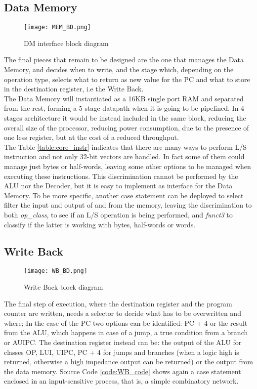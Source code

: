 \subsection{Data Memory}
\begin{figure}[!ht]
    \centering
    \texttt{[image: MEM\_BD.png]}
    \caption{DM interface block diagram}
    \label{fig:DM_BD}
\end{figure}

The final pieces that remain to be designed are the one that manages the Data Memory, and decides when to write, and the stage which, depending on the operation type, selects what to return as new value for the PC and what to store in the destination register, i.e the Write Back.\\
The Data Memory will instantiated as a 16KB single port RAM and separated from the rest, forming a 5-stage datapath when it is going to be pipelined. In 4-stages architecture it would be instead included in the same block, reducing the overall size of the processor, reducing power consumption, due to the presence of one less register, but at the cost of a reduced throughput.\\
The Table \ref{table:core_instr} indicates that there are many ways to perform L/S instruction and not only 32-bit vectors are handled. In fact some of them could manage just bytes or half-words, leaving some other options to be managed when executing these instructions. This discrimination cannot be performed by the ALU nor the Decoder, but it is easy to implement as interface for the Data Memory.
To be more specific, another case statement can be deployed to select filter the input and output of and from the memory, leaving the discrimination to both \emph{op{\_}class}, to see if an L/S operation is being performed, and \emph{funct3} to classify if the latter is working with bytes, half-words or words.

\subsection{Write Back}
\begin{figure}[!ht]
    \centering
    \texttt{[image: WB\_BD.png]}
    \caption{Write Back block diagram}
    \label{fig:WB_BD}
\end{figure}

The final step of execution, where the destination register and the program counter are written, needs a selector to decide what has to be overwritten and where; In the case of the PC two options can be identified: PC + 4 or the result from the ALU, which happens in case of a jump, a true condition from a branch or AUIPC. The destination register instead can be: the output of the ALU for classes OP, LUI, UIPC, PC + 4 for jumps and branches (when a logic high is returned, otherwise a high impedance output can be returned) or the output from the data memory. Source Code \ref{code:WB_code} shows again a case statement enclosed in an input-sensitive process, that is, a simple combinatory network.

